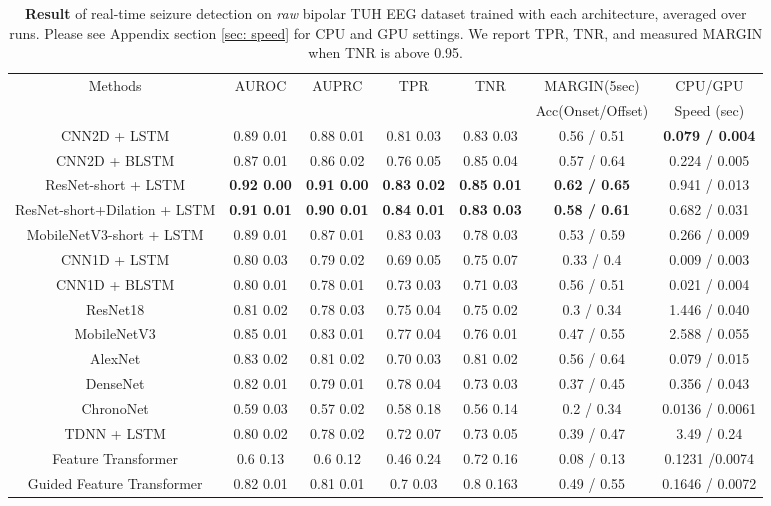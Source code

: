\documentclass[pmlr,twocolumn,10pt]{jmlr}
\begin{document}
\begin{table*}[ht!]
	\tiny
	\centering
	\caption{\textbf{Result} of real-time seizure detection on \textit{raw} bipolar TUH EEG dataset trained with each architecture, averaged over  runs. Please see Appendix section \ref{sec: speed} for CPU and GPU settings. We report TPR, TNR, and measured MARGIN when TNR is above 0.95.}
	\label{Result}
	\begin{tabular}{c|cccccc}
		\toprule
		Methods & AUROC & AUPRC & TPR & TNR & MARGIN(5sec)  &  CPU/GPU\\
		&&&&& Acc(Onset/Offset) & Speed (sec)\\
		\midrule
		CNN2D + LSTM &  0.89  0.01  &  0.88  0.01 &  0.81  0.03  &  0.83  0.03 & 0.56 / 0.51  & \textbf{0.079 / 0.004} \\
		CNN2D + BLSTM &  0.87  0.01  &  0.86  0.02  &  0.76  0.05  &  0.85  0.04 & 0.57 / 0.64  & 0.224 / 0.005 \\
	    ResNet-short + LSTM &  \textbf{0.92  0.00}  &  \textbf{0.91  0.00}  &  \textbf{0.83  0.02}  &  \textbf{0.85  0.01} & \textbf{0.62 / 0.65}  & 0.941 / 0.013 \\
		ResNet-short+Dilation + LSTM &  \textbf{0.91  0.01} &  \textbf{0.90  0.01} &  \textbf{0.84  0.01} & \textbf{0.83  0.03} & \textbf{0.58 / 0.61} & 0.682 / 0.031 \\
		MobileNetV3-short + LSTM &  0.89  0.01  &  0.87  0.01  &  0.83  0.03  &  0.78  0.03 & 0.53 / 0.59 & 0.266 / 0.009 \\
		\midrule
		CNN1D + LSTM &  0.80  0.03  &  0.79  0.02 &  0.69  0.05  &  0.75  0.07 & 0.33 / 0.4 & 0.009 / 0.003 \\
		CNN1D + BLSTM &  0.80  0.01  &  0.78  0.01 &  0.73  0.03  &  0.71  0.03 & 0.56 / 0.51  & 0.021 / 0.004 \\
		\midrule
        ResNet18 & 0.81  0.02 & 0.78  0.03 & 0.75  0.04 & 0.75  0.02 & 0.3 / 0.34 & 1.446 / 0.040   \\
		MobileNetV3 & 0.85  0.01 & 0.83  0.01 & 0.77  0.04 & 0.76  0.01 & 0.47 / 0.55 & 2.588 / 0.055   \\
		AlexNet & 0.83  0.02 & 0.81  0.02 & 0.70  0.03 & 0.81  0.02 & 0.56 / 0.64 & 0.079 / 0.015   \\
		DenseNet & 0.82  0.01 & 0.79  0.01 & 0.78  0.04 & 0.73  0.03 & 0.37 / 0.45 & 0.356 / 0.043   \\
ChronoNet & 0.59  0.03 & 0.57  0.02 & 0.58  0.18 & 0.56  0.14 & 0.2 / 0.34 & 0.0136 / 0.0061   \\
		TDNN + LSTM & 0.80  0.02 & 0.78  0.02 & 0.72  0.07 & 0.73  0.05 & 0.39 / 0.47 & 3.49 / 0.24    \\
\midrule
		Feature Transformer & 0.6  0.13 & 0.6  0.12 & 0.46  0.24 & 0.72  0.16 &  0.08 / 0.13 & 0.1231 /0.0074 \\
Guided Feature Transformer  & 0.82  0.01 & 0.81  0.01 & 0.7  0.03 & 0.8  0.163 & 0.49 / 0.55 & 0.1646 / 0.0072 \\
\bottomrule
	\end{tabular}
\end{table*}
\end{document}
